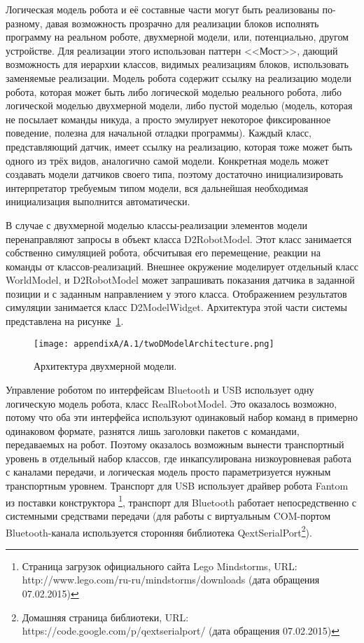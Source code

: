 Логическая модель робота и её составные части могут быть реализованы по-разному, давая 
возможность прозрачно для реализации блоков исполнять программу на реальном роботе, 
двухмерной модели, или, потенциально, другом устройстве. Для реализации этого использован 
паттерн <<Мост>>, дающий возможность для иерархии классов, видимых реализациям блоков, 
использовать заменяемые реализации. Модель робота содержит ссылку на реализацию модели 
робота, которая может быть либо логической моделью реального робота, либо логической 
моделью двухмерной модели, либо пустой моделью (модель, которая не посылает команды 
никуда, а просто эмулирует некоторое фиксированное поведение, полезна для начальной 
отладки программы). Каждый класс, представляющий датчик, имеет ссылку на реализацию, 
которая тоже может быть одного из трёх видов, аналогично самой модели. Конкретная 
модель может создавать модели датчиков своего типа, поэтому достаточно инициализировать 
интерпретатор требуемым типом модели, вся дальнейшая необходимая инициализация выполнится 
автоматически.

В случае с двухмерной моделью классы-реализации элементов модели перенаправляют запросы 
в объект класса D2RobotModel. Этот класс занимается собственно симуляцией робота, 
обсчитывая его перемещение, реакции на команды от классов-реализаций. Внешнее окружение 
моделирует отдельный класс WorldModel, и D2RobotModel может запрашивать показания 
датчика в заданной позиции и с заданным направлением у этого класса. Отображением 
результатов симуляции занимается класс D2ModelWidget. Архитектура этой части системы 
представлена на рисунке~\ref{image:twoDModelArchitecture}.

\begin{figure} [ht]
	\begin{center}
		\texttt{[image: appendixA/A.1/twoDModelArchitecture.png]}
		\caption{Архитектура двухмерной модели.}
		\label{image:twoDModelArchitecture}
	\end{center}
\end{figure}

Управление роботом по интерфейсам Bluetooth и USB использует одну логическую модель 
робота, класс RealRobotModel. Это оказалось возможно, потому что оба эти интерфейса 
используют одинаковый набор команд в примерно одинаковом формате, разнятся лишь заголовки 
пакетов с командами, передаваемых на робот. Поэтому оказалось возможным вынести транспортный 
уровень в отдельный набор классов, где инкапсулирована низкоуровневая работа с каналами 
передачи, и логическая модель просто параметризуется нужным транспортным уровнем. 
Транспорт для USB использует драйвер робота Fantom из поставки конструктора%
\footnote{Страница загрузок официального сайта Lego Mindstorms, URL: http://www.lego.com/ru-ru/mindstorms/downloads (дата обращения 07.02.2015)}, 
транспорт для Bluetooth работает непосредственно с системными средствами передачи 
(для работы с виртуальным COM-портом Bluetooth-канала используется сторонняя библиотека 
QextSerialPort\footnote{Домашняя страница библиотеки, URL: https://code.google.com/p/qextserialport/ (дата обращения 07.02.2015)}).

